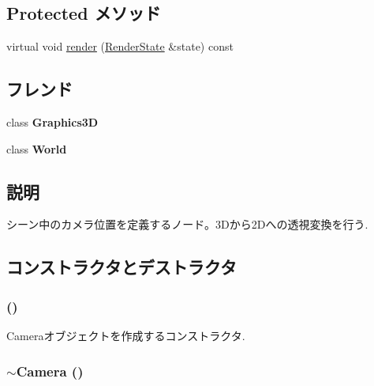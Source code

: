 \subsection*{Protected メソッド}
\begin{CompactItemize}
\item 
virtual void \hyperlink{classm3g_1_1Camera_8babc8a79b78615da51161e94029eea9}{render} (\hyperlink{structm3g_1_1RenderState}{RenderState} \&state) const 
\end{CompactItemize}
\subsection*{フレンド}
\begin{CompactItemize}
\item 
\hypertarget{classm3g_1_1Camera_8174d4c629550c1ee279571250236ef4}{
class \textbf{Graphics3D}}
\label{classm3g_1_1Camera_8174d4c629550c1ee279571250236ef4}

\item 
\hypertarget{classm3g_1_1Camera_7b4bcdf992c21ae83363f25df05b1d25}{
class \textbf{World}}
\label{classm3g_1_1Camera_7b4bcdf992c21ae83363f25df05b1d25}

\end{CompactItemize}


\subsection{説明}
シーン中のカメラ位置を定義するノード。3Dから2Dへの透視変換を行う. 

\subsection{コンストラクタとデストラクタ}
\hypertarget{classm3g_1_1Camera_a3f3efcb2fcc75de885df29041103cd2}{
\subsubsection[{Camera}]{ ()}}
\label{classm3g_1_1Camera_a3f3efcb2fcc75de885df29041103cd2}


Cameraオブジェクトを作成するコンストラクタ. \hypertarget{classm3g_1_1Camera_b921e886e6f14e117eb8099ccb0a3775}{
\subsubsection[{$\sim$Camera}]{\setlength{\rightskip}{0pt plus 5cm}$\sim${\bf Camera} ()}}
\label{classm3g_1_1Camera_b921e886e6f14e117eb8099ccb0a3775}


